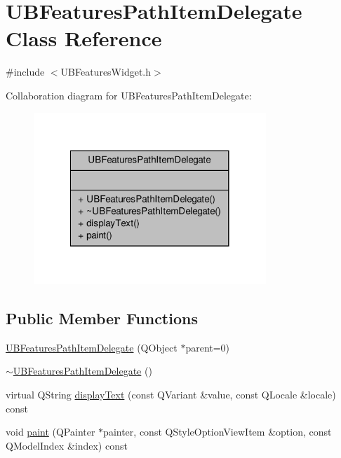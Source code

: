 \hypertarget{class_u_b_features_path_item_delegate}{\section{U\-B\-Features\-Path\-Item\-Delegate Class Reference}
\label{d0/dea/class_u_b_features_path_item_delegate}
}


{\ttfamily \#include $<$U\-B\-Features\-Widget.\-h$>$}



Collaboration diagram for U\-B\-Features\-Path\-Item\-Delegate\-:
\nopagebreak
\begin{figure}[H]
\begin{center}
\leavevmode
\includegraphics[width=248pt]{d4/dc9/class_u_b_features_path_item_delegate__coll__graph}
\end{center}
\end{figure}
\subsection*{Public Member Functions}
\begin{DoxyCompactItemize}
\item 
\hyperlink{class_u_b_features_path_item_delegate_ae453ca0b18e0642683a2d08638a3765c}{U\-B\-Features\-Path\-Item\-Delegate} (Q\-Object $\ast$parent=0)
\item 
\hyperlink{class_u_b_features_path_item_delegate_a9037f4dc05c2807e717316f14b96f75c}{$\sim$\-U\-B\-Features\-Path\-Item\-Delegate} ()
\item 
virtual Q\-String \hyperlink{class_u_b_features_path_item_delegate_a41f49cb6c3a3452463f2cdd6a95ca40c}{display\-Text} (const Q\-Variant \&value, const Q\-Locale \&locale) const 
\item 
void \hyperlink{class_u_b_features_path_item_delegate_a89a4e70e902375f5c5f2032442bda8b3}{paint} (Q\-Painter $\ast$painter, const Q\-Style\-Option\-View\-Item \&option, const Q\-Model\-Index \&index) const 
\end{DoxyCompactItemize}


